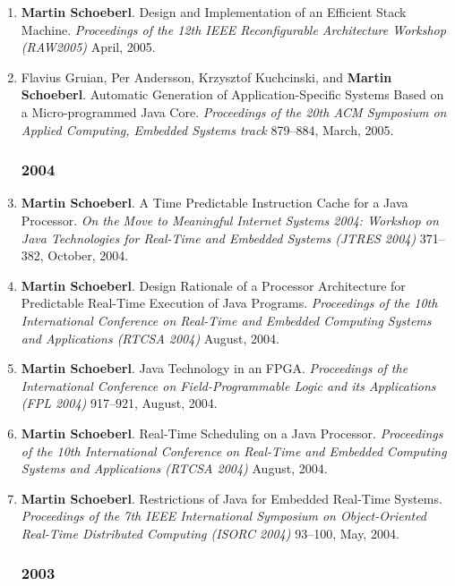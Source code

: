 \begin{enumerate}
\item {\bf Martin Schoeberl}.
 Design and Implementation of an Efficient Stack Machine.
 \emph{Proceedings of the 12th IEEE Reconfigurable Architecture Workshop (RAW2005)} April, 2005.

\item Flavius Gruian, Per Andersson, Krzysztof Kuchcinski, and {\bf Martin Schoeberl}.
 Automatic Generation of Application-Specific Systems Based on a Micro-programmed Java Core.
 \emph{Proceedings of the 20th ACM Symposium on Applied Computing, Embedded Systems track} 879--884, March, 2005.


\subsubsection*{2004}

\item {\bf Martin Schoeberl}.
 A Time Predictable Instruction Cache for a Java Processor.
 \emph{On the Move to Meaningful Internet Systems 2004: Workshop on {J}ava Technologies for Real-Time and Embedded Systems (JTRES 2004)} 371--382, October, 2004.

\item {\bf Martin Schoeberl}.
 Design Rationale of a Processor Architecture for Predictable Real-Time Execution of Java Programs.
 \emph{Proceedings of the 10th International Conference on Real-Time and Embedded Computing Systems and Applications (RTCSA 2004)} August, 2004.

\item {\bf Martin Schoeberl}.
 Java Technology in an FPGA.
 \emph{Proceedings of the International Conference on Field-Programmable Logic and its Applications (FPL 2004)} 917--921, August, 2004.

\item {\bf Martin Schoeberl}.
 Real-Time Scheduling on a Java Processor.
 \emph{Proceedings of the 10th International Conference on Real-Time and Embedded Computing Systems and Applications (RTCSA 2004)} August, 2004.

\item {\bf Martin Schoeberl}.
 Restrictions of Java for Embedded Real-Time Systems.
 \emph{Proceedings of the 7th IEEE International Symposium on Object-Oriented Real-Time Distributed Computing (ISORC 2004)} 93--100, May, 2004.


\subsubsection*{2003}


\end{enumerate}
